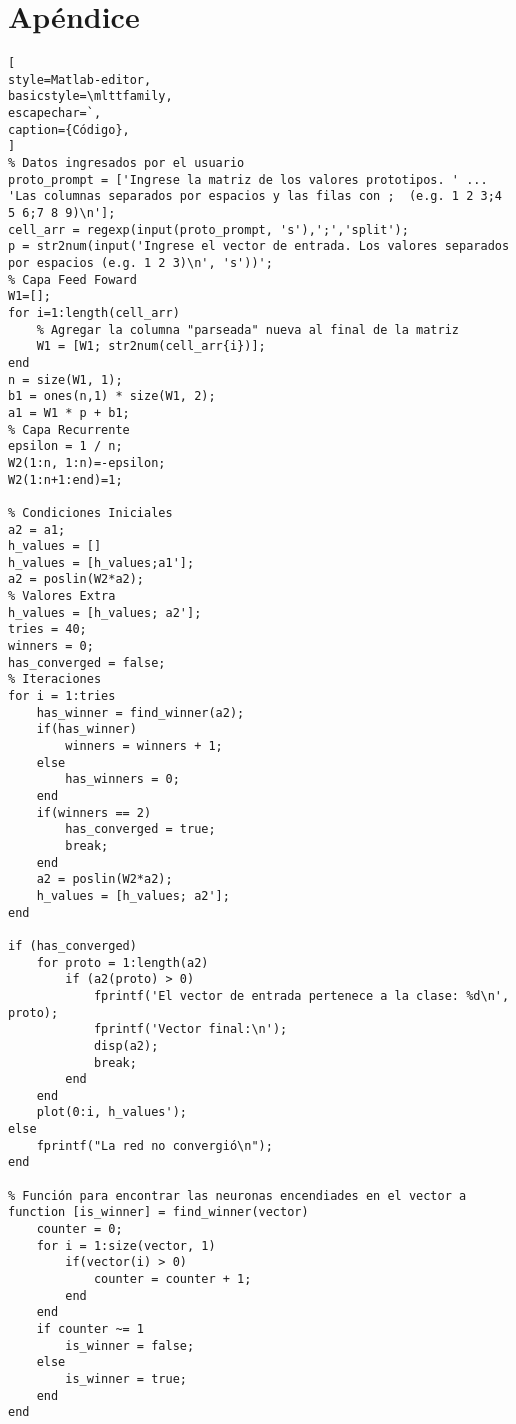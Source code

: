 \documentclass{article}
\begin{document}
\section{Apéndice}
\begin{lstlisting}[
style=Matlab-editor,
basicstyle=\mlttfamily,
escapechar=`,
caption={Código},
]
% Datos ingresados por el usuario
proto_prompt = ['Ingrese la matriz de los valores prototipos. ' ...
'Las columnas separados por espacios y las filas con ;  (e.g. 1 2 3;4 5 6;7 8 9)\n'];
cell_arr = regexp(input(proto_prompt, 's'),';','split');
p = str2num(input('Ingrese el vector de entrada. Los valores separados por espacios (e.g. 1 2 3)\n', 's'))';
% Capa Feed Foward
W1=[];
for i=1:length(cell_arr)
	% Agregar la columna "parseada" nueva al final de la matriz
	W1 = [W1; str2num(cell_arr{i})];
end
n = size(W1, 1);
b1 = ones(n,1) * size(W1, 2);
a1 = W1 * p + b1;
% Capa Recurrente
epsilon = 1 / n;
W2(1:n, 1:n)=-epsilon;
W2(1:n+1:end)=1;

% Condiciones Iniciales
a2 = a1;
h_values = []
h_values = [h_values;a1'];
a2 = poslin(W2*a2);
% Valores Extra
h_values = [h_values; a2'];
tries = 40;
winners = 0;
has_converged = false;
% Iteraciones
for i = 1:tries
	has_winner = find_winner(a2);
	if(has_winner)
		winners = winners + 1;
	else
		has_winners = 0;
	end
	if(winners == 2)
		has_converged = true;
		break;
	end
	a2 = poslin(W2*a2);
	h_values = [h_values; a2'];
end

if (has_converged)
	for proto = 1:length(a2)
		if (a2(proto) > 0)
			fprintf('El vector de entrada pertenece a la clase: %d\n', proto);
			fprintf('Vector final:\n');
			disp(a2);
			break;
		end
	end
	plot(0:i, h_values');
else
	fprintf("La red no convergió\n");
end

% Función para encontrar las neuronas encendiades en el vector a
function [is_winner] = find_winner(vector)
	counter = 0;
	for i = 1:size(vector, 1)
		if(vector(i) > 0)
			counter = counter + 1;
		end 
	end
	if counter ~= 1
		is_winner = false;
	else
		is_winner = true;
	end
end
\end{lstlisting}
\end{document}
